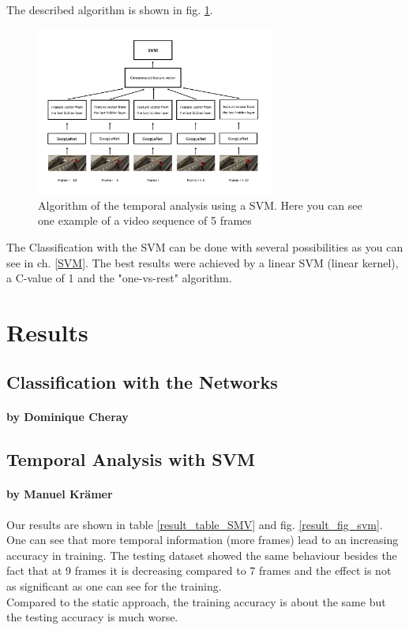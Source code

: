\documentclass[11pt]{report}
\begin{document}
The described algorithm is shown in fig. \ref{fig_svm}.

\begin{figure}
  \centering
  \includegraphics[width=0.7\textwidth]{Illustration_SVM.png}
  \caption{Algorithm of the temporal analysis using a SVM. Here you can see one example of a video sequence of 5 frames}
  \label{fig_svm}
\end{figure}

The Classification with the SVM can be done with several possibilities as you can see in ch. \ref{SVM}. The best results were achieved by a linear SVM (linear kernel), a C-value of 1 and the "one-vs-rest" algorithm. 


\chapter{Results}
\section{Classification with the Networks}
\subsubsection{by Dominique Cheray}

\section{Temporal Analysis with SVM}
\subsubsection{by Manuel Krämer}
Our results are shown in table \ref{result_table_SMV} and fig. \ref{result_fig_svm}.
One can see that more temporal information (more frames) lead to an increasing accuracy in training. The testing dataset showed the same behaviour besides the fact that at 9 frames it is decreasing compared to 7 frames and the effect is not as significant as one can see for the training.\\
Compared to the static approach, the training accuracy is about the same but the testing accuracy is much worse.
\end{document}
